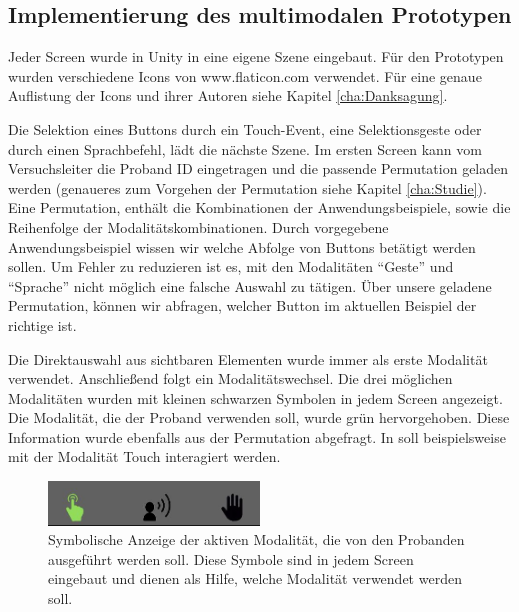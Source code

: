 \subsection[Implementierung]{Implementierung des multimodalen Prototypen}
Jeder Screen wurde in Unity in eine eigene Szene eingebaut. Für den Prototypen wurden verschiedene Icons von www.flaticon.com verwendet. 
Für eine genaue Auflistung der Icons und ihrer Autoren siehe Kapitel \ref{cha:Danksagung}.

Die Selektion eines Buttons durch ein Touch-Event, eine Selektionsgeste oder durch einen Sprachbefehl, lädt die nächste Szene. 
Im ersten Screen kann vom Versuchsleiter die Proband ID eingetragen und die passende Permutation geladen werden (genaueres zum Vorgehen der Permutation siehe Kapitel \ref{cha:Studie}). 
Eine Permutation, enthält die Kombinationen der Anwendungsbeispiele, sowie die Reihenfolge der Modalitätskombinationen. 
Durch vorgegebene Anwendungsbeispiel wissen wir welche Abfolge von Buttons betätigt werden sollen.
Um Fehler zu reduzieren ist es, mit den Modalitäten "`Geste"' und "`Sprache"' nicht möglich eine falsche Auswahl zu tätigen. 
Über unsere geladene Permutation, können wir abfragen, welcher Button im aktuellen Beispiel der richtige ist. 

Die Direktauswahl aus sichtbaren Elementen wurde immer als erste Modalität verwendet.
Anschließend folgt ein Modalitätswechsel. 
Die drei möglichen Modalitäten wurden mit kleinen schwarzen Symbolen in jedem Screen angezeigt. 
Die Modalität, die der Proband verwenden soll, wurde grün hervorgehoben. Diese Information wurde ebenfalls aus der Permutation abgefragt.
In  soll beispielsweise mit der Modalität Touch interagiert werden. 
\begin{figure}[ht]
  \centering
  \includegraphics[width=0.5\textwidth]{img/ModusAktiv.jpg}
  \caption[Symbolische Anzeige der aktiven Modalität]{Symbolische Anzeige der aktiven Modalität, die von den Probanden ausgeführt werden soll. Diese Symbole sind in jedem Screen eingebaut und dienen als Hilfe, welche Modalität verwendet werden soll.}
  \label{fig:ModusAktiv}
\end{figure}

